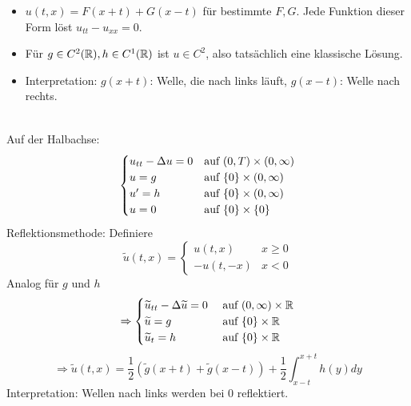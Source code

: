 \begin{bem}
	\begin{itemize}
		\item $u(t,x) = F(x+t) + G(x-t)$ für bestimmte $F,G$. Jede Funktion dieser Form löst $u_{tt}-u_{xx} = 0$.
		\item Für $g \in C^2(\mathbb{R}), h \in C^1(\mathbb{R})$ ist $u \in C^2$, also tatsächlich eine klassische Lösung.
		\item Interpretation: $g(x+t)$: Welle, die nach links läuft, $g(x-t)$: Welle nach rechts.
	\end{itemize}
\end{bem}
	
\mbox{} \\
Auf der Halbachse:
	\[ \begin{cases}
	u_{tt} - \Delta u = 0	&	\text{auf } (0,T) \times (0,\infty)	\\
	u = g	&	\text{auf } \{0\} \times (0,\infty)	\\
	u' = h	&	\text{auf } \{0\} \times (0,\infty) \\
	u = 0 & \text{auf } \{0\} \times \{0\}
	\end{cases} \]
Reflektionsmethode: Definiere
\[ \widetilde{u}(t,x) = \begin{cases}
	u(t,x) & x \geq 0 \\
	-u(t,-x) & x < 0 \end{cases} \]
Analog für $g$ und $h$
\[ \Rightarrow \begin{cases}
	\widetilde{u}_{tt} - \Delta \widetilde{u} = 0 & \text{ auf } (0,\infty) \times \mathbb{R} \\
	\widetilde{u} = g & \text{ auf } \{0\} \times \mathbb{R} \\
	\widetilde{u}_t = h & \text{ auf } \{0\} \times \mathbb{R} \end{cases} \]
\[ \Rightarrow \widetilde{u}(t,x) = \frac{1}{2} (\widetilde{g}(x+t) + \widetilde{g}(x-t)) + \frac{1}{2} \int_{x-t}^{x+t} h(y) dy \]
Interpretation: Wellen nach links werden bei 0 reflektiert.
\newpage